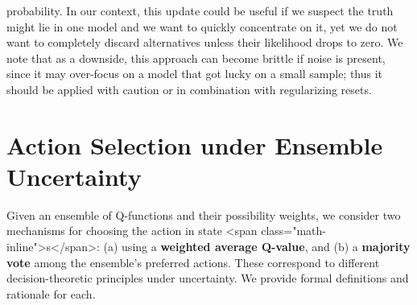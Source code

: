 \documentclass{article}
\begin{document}
probability. In our context, this update could be useful if we suspect the truth might lie in one model and we want to quickly concentrate on it, yet we do not want to completely discard alternatives unless their likelihood drops to zero. We note that as a downside, this approach can become brittle if noise is present, since it may over-focus on a model that got lucky on a small sample; thus it should be applied with caution or in combination with regularizing resets.

\section*{Action Selection under Ensemble Uncertainty}
Given an ensemble of Q-functions and their possibility weights, we consider two mechanisms for choosing the action in state <span class="math-inline">s</span>: (a) using a \textbf{weighted average Q-value}, and (b) a \textbf{majority vote} among the ensemble’s preferred actions. These correspond to different decision-theoretic principles under uncertainty. We provide formal definitions and rationale for each.
\end{document}
